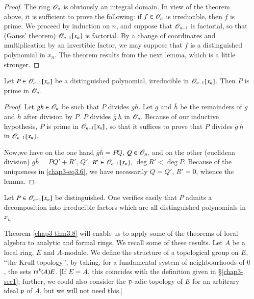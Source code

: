 \begin{proof}
The ring $\mathscr{O}_{n}$ is obviously an integral domain. In view of the theorem above, it is sufficient to prove the following: if $f\in \mathscr{O}_{n}$ is irreducible, then $f$ is prime. We proceed by induction on $n$, and suppose that $\mathscr{O}_{n-1}$ is factorial, so that (Gauss' theorem) $\mathscr{O}_{n-1}[x_{n}]$ is factorial. By a change of coordinates and multiplication by an invertible factor, we may suppose that $f$ is a distinguished polynomial in $x_{n}$. The theorem results from the next lemma, which is a little stronger.
\end{proof}

\begin{lemma}\label{chap3-lem3.10}
Let $P\in \mathscr{O}_{n-1}[x_{n}]$ be a distinguished polynomial, irreducible in $\mathscr{O}_{n-1}[x_{n}]$. Then $P$ is prime in $\mathscr{O}_{n}$.
\end{lemma}

\begin{proof}
Let $gh\in \mathscr{O}_{n}$ be such that $P$ divides $gh$. Let $\overline{g}$ and $\overline{h}$ be the remainders of $g$ and $h$ after division by $P$. $P$ divides $\overline{g} \ \overline{h}$ in $\mathscr{O}_{n}$. Because of our inductive hypothesis, $P$ is prime in $\mathscr{O}_{n-1}[x_{n}]$, so that it suffices to prove that $P$ divides $\overline{g} \ \overline{h}$ in $\mathscr{O}_{n-1}[x_{n}]$.

Now,\pageoriginale we have on the one hand $\overline{g}\overline{h}=PQ$, $Q\in \mathscr{O}_{n}$, and on the other (euclidean division) $\overline{g}\overline{h}=PQ'+R'$, $Q'$, $R'\in \mathscr{O}_{n-1}[x_{n}]$, $\deg R'<\deg P$. Because of the uniqueness in \eqref{chap3-eq3.6}, we have necessarily $Q=Q'$, $R'=0$, whence the lemma.
\end{proof}

\begin{remark}\label{chap3-rem3.11}
Let $P\in \mathscr{O}_{n-1}[x_{n}]$ be distinguished. One verifies easily that $P$ admits a decomposition into irreducible factors which are all distinguished polynomials in $x_{n}$.
\end{remark}

Theorem \ref{chap3-thm3.8} will enable us to apply some of the theorems of local algebra to analytic and formal rings. We recall some of these results. Let $A$ be a local ring, $E$ and $A$-module. We define the structure of a topological group on $E$, ``the Krull topology'', by taking, for a fundamental system of neighbourhoods of $0$, the sets $\mathfrak{m}^{k}(A)E$. [If $E=A$, this coincides with the definition given in \S\ref{chap3-sec1}; further, we could also consider the $\mathfrak{p}$-adic topology of $E$ for an arbitrary ideal $\mathfrak{p}$ of $A$, but we will not need this.]

